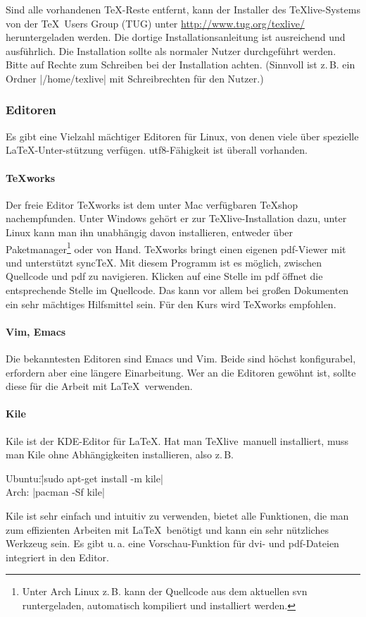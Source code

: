 \documentclass[12pt,ngerman]{scrartcl}
\newcommand{\TeXlive}{\TeX\textsf{live}\xspace}
\begin{document}
Sind alle vorhandenen \TeX-Reste entfernt, kann der Installer des \TeXlive-Systems von der \TeX\ Users Group (TUG) unter \url{http://www.tug.org/texlive/} heruntergeladen werden. Die dortige Installationsanleitung ist ausreichend und ausführlich. Die Installation sollte als normaler Nutzer durchgeführt werden. Bitte auf Rechte zum Schreiben bei der Installation achten. (Sinnvoll ist z.\,B. ein Ordner |/home/texlive| mit Schreibrechten für den Nutzer.)

\subsubsection{Editoren}
Es gibt eine Vielzahl mächtiger Editoren für Linux, von denen viele über spezielle \LaTeX-Unter-stützung verfügen. utf8-Fähigkeit ist überall vorhanden.

\paragraph{\TeX works}
Der freie Editor \TeX works ist dem unter Mac verfügbaren \TeX shop nachempfunden. Unter Windows gehört er zur \TeX live-Installation dazu, unter Linux kann man ihn unabhängig davon installieren, entweder über Paketmanager\footnote{Unter Arch Linux z.\,B. kann der Quellcode aus dem aktuellen svn runtergeladen, automatisch kompiliert und installiert werden.} oder von Hand.  \TeX works bringt einen eigenen pdf-Viewer mit und unterstützt sync\TeX. Mit diesem Programm ist es möglich, zwischen Quellcode und pdf zu navigieren. Klicken auf eine Stelle im pdf öffnet die entsprechende Stelle im Quellcode. Das kann vor allem bei großen Dokumenten ein sehr mächtiges Hilfsmittel sein. Für den Kurs wird \TeX works empfohlen.

\paragraph{Vim, Emacs}
Die bekanntesten Editoren sind Emacs und Vim. Beide sind höchst konfigurabel, erfordern aber eine längere Einarbeitung. Wer an die Editoren gewöhnt ist, sollte diese für die Arbeit mit \LaTeX\ verwenden.

\paragraph{Kile}
Kile ist der KDE-Editor für \LaTeX. Hat man \TeXlive\ manuell installiert, muss man Kile ohne Abhängigkeiten installieren, also z.\,B.
\begin{tabbing}
Ubuntu:\quad \= |sudo apt-get install -m kile|\\
Arch: \> |pacman -Sf kile|
\end{tabbing}
Kile ist sehr einfach und intuitiv zu verwenden, bietet alle Funktionen, die man zum effizienten Arbeiten mit \LaTeX\ benötigt und kann ein sehr nützliches Werkzeug sein. Es gibt u.\,a. eine Vorschau-Funktion für dvi- und pdf-Dateien integriert in den Editor.
\end{document}
